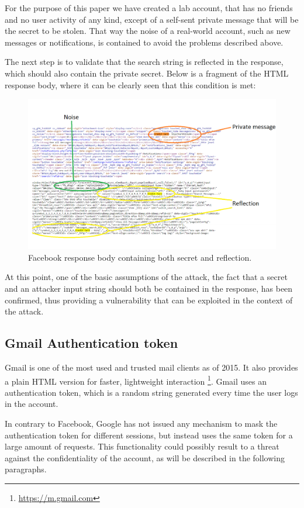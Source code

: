 For the purpose of this paper we have created a lab account, that has no friends
and no user activity of any kind, except of a self-sent private message that
will be the secret to be stolen. That way the noise of a real-world account,
such as new messages or notifications, is contained to avoid the problems
described above.

The next step is to validate that the search string is reflected in the
response, which should also contain the private secret. Below is a fragment of
the HTML response body, where it can be clearly seen that this condition is met:

\begin{figure}[H] \caption{Facebook response body containing both secret and
reflection.} \centering
\includegraphics[width=1.1\textwidth]{diagrams/fb_response.png}\end{figure}

At this point, one of the basic assumptions of the attack, the fact that a
secret and an attacker input string should both be contained in the response,
has been confirmed, thus providing a vulnerability that can be exploited in the
context of the attack.

\subsection{Gmail Authentication token}

Gmail is one of the most used and trusted mail clients as of 2015. It also
provides a plain HTML version for faster, lightweight interaction
\footnote{\url{https://m.gmail.com}}. Gmail uses an authentication token, which
is a random string generated every time the user logs in the account.

In contrary to Facebook, Google has not issued any mechanism to mask the
authentication token for different sessions, but instead uses the same token for
a large amount of requests. This functionality could possibly result to a threat
against the confidentiality of the account, as will be described in the
following paragraphs.

